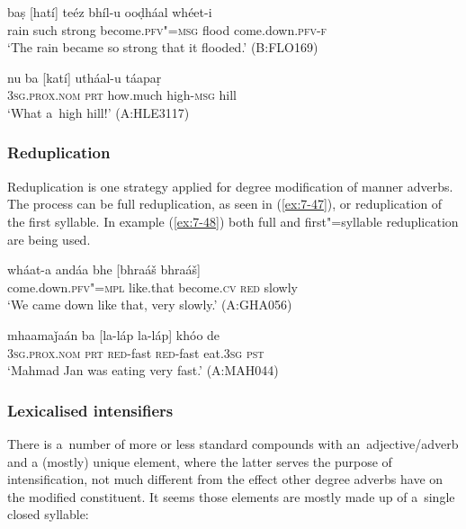 \begin{exe}
\ex
\label{ex:7-45}
\gll baṣ [hatí] teéz bhíl-u ooḍháal whéet-i \\
rain such strong become.\textsc{pfv"=msg} flood come.down.\textsc{pfv-f} \\
\glt `The rain became so strong that it flooded.' (B:FLO169)
\end{exe}
\begin{exe}
\ex
\label{ex:7-46}
\gll nu ba [katí] utháal-u táapaṛ \\
\textsc{3sg.prox.nom} \textsc{prt} how.much high-\textsc{msg}  hill  \\
\glt `What a~high hill!' (A:HLE3117)
\end{exe}

\subsubsection*{Reduplication}

Reduplication is one strategy applied for degree modification of manner adverbs. The process can be
full reduplication, as seen in (\ref{ex:7-47}), or reduplication of the first syllable. In example
(\ref{ex:7-48}) both full and first"=syllable reduplication are being used.

\begin{exe}
\ex
\label{ex:7-47}
\gll wháat-a andáa bhe [bhraáš bhraáš] \\
come.down.\textsc{pfv"=mpl} like.that become.\textsc{cv} \textsc{red} slowly  \\
\glt `We came down like that, very slowly.' (A:GHA056)
\end{exe}
\begin{exe}
\ex
\label{ex:7-48}
\gll mhaamaǰaán ba [la-láp la-láp] khóo de \\
\textsc{3sg.prox.nom} \textsc{prt} \textsc{red}-fast \textsc{red}-fast eat.\textsc{3sg} \textsc{pst } \\
\glt `Mahmad Jan was eating very fast.' (A:MAH044)
\end{exe}

\subsubsection*{Lexicalised intensifiers}

There is a~number of more or less standard compounds with an~adjective/adverb and a (mostly) unique
element, where the latter serves the purpose of intensification, not much different from the effect
other degree adverbs have on the modified constituent. It seems those elements are mostly made up of
a~single closed syllable:


